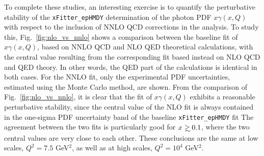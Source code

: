 To complete these studies, an interesting exercise is to quantify the perturbative stability of
the {\tt xFitter\_epHMDY}
determination of the photon PDF $x\gamma(x,Q)$ with respect to the inclusion
of NNLO QCD corrections in the analysis.
%
To study this, Fig.~\ref{fig:nlo_vs_nnlo} shows a
comparison between the baseline fit of $x\gamma(x,Q)$, based on NNLO
QCD and NLO QED theoretical calculations, with the central value resulting from the
corresponding fit
based instead on NLO QCD and QED theory.
%
In other words, the QED part of the calculations is identical in both cases.
%
For the NNLO fit, only the experimental PDF uncertainties, estimated
using the Monte Carlo method, are shown.
%
From the comparison of Fig.~\ref{fig:nlo_vs_nnlo}, it is clear that the
fit of $x\gamma(x,Q)$ exhibits a reasonable perturbative stability,
since the central value of the NLO fit is always contained in the
one-sigma PDF uncertainty band of the baseline {\tt xFitter\_epHMDY} fit
%
The agreement between the two fits is particularly good for
$x\gsim 0.1$, where the two central values are very close to each
other.
%
These conclusions are the same at low scales, $Q^2=7.5$ GeV$^2$, as well
as at high scales, $Q^2=10^4$ GeV$^2$.

